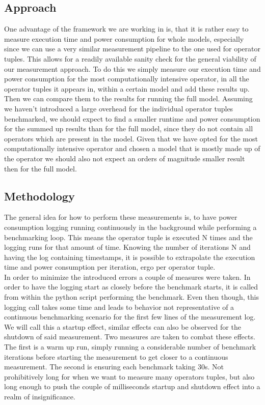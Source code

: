 \documentclass[conference]{IEEEtran}
\begin{document}
\subsection{Approach}
One advantage of the framework we are working in is, that it is rather easy to measure execution time and power consumption for whole models, especially since we can use a very similar measurement pipeline to the one used for operator tuples. This allows for a readily available sanity check for the general viability of our measurement approach. To do this we simply measure our execution time and power consumption for the most computationally intensive operator, in all the operator tuples it appears in, within a certain model and add these results up. Then we can compare them to the results for running the full model. Assuming we haven’t introduced a large overhead for the individual operator tuples benchmarked, we should expect to find a smaller runtime and power consumption for the summed up results than for the full model, since they do not contain all operators which are present in the model. Given that we have opted for the most computationally intensive operator and chosen a model that is mostly made up of the operator we should also not expect an orders of magnitude smaller result then for the full model. 

\subsection{Methodology}
The general idea for how to perform these measurements is, to have power consumption logging running continuously in the background while performing a benchmarking loop. This means the operator tuple is executed N times and the logging runs for that amount of time. Knowing the number of iterations N and having the log containing timestamps, it is possible to extrapolate the execution time and power consumption per iteration, ergo per operator tuple. \\
In order to minimize the introduced errors a couple of measures were taken. In order to have the logging start as closely before the benchmark starts, it is called from within the python script performing the benchmark. Even then though, this logging call takes some time and leads to behavior not representative of a continuous benchmarking scenario for the first few lines of the measurement log. We will call this a startup effect, similar effects can also be observed for the shutdown of said measurement. Two measures are taken to combat these effects. The first is a warm up run, simply running a considerable number of benchmark iterations before starting the measurement to get closer to a continuous measurement. The second is ensuring each benchmark taking 30s. Not prohibitively long for when we want to measure many operators tuples, but also long enough to push the couple of milliseconds startup and shutdown effect into a realm of insignificance.
\end{document}
